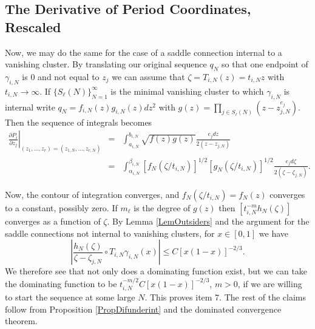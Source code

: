 \documentclass[12pt]{article}
\begin{document}
\subsection{The Derivative of Period Coordinates, Rescaled}

\noindent Now, we may do the same for the case of a saddle connection internal to a vanishing cluster. By translating our original sequence $q_N$ so that one endpoint of $\gamma_{i,N}$ is $0$ and not equal to $z_j$ we can assume that $\zeta = T_{i,N}(z) = t_{i,N}z$ with $t_{i,N} \to \infty$. If $\{S_\ell(N)\}_{N = 1}^\infty$ is the minimal vanishing cluster to which $\gamma_{i,N}$ is internal write $q_N = f_{i,N}(z)g_{i,N}(z)dz^2$ with $g(z) = \prod\limits_{j \in S_\ell(N)}(z - z_{j,N}^{e_j}).$ Then the sequence of integrals becomes $$\begin{array}{rcl} \left. \frac{\partial P_i}{\partial z_j}\right|_{(z_1,...,z_r) = (z_{1,N},...,z_{r,N})} & = & \int_{a_{i,N}}^{b_{i,N}} \sqrt{f(z)g(z)} \frac{e_j dz}{2(z - z_{j,N})}\\
{} & = & \int_{\alpha_{i,N}}^{\beta_{i,N}} [f_N(\zeta/t_{i,N})]^{1/2} [g_N(\zeta/t_{i,N})]^{1/2} \frac{e_j d\zeta}{2(\zeta - \zeta_{j,N})}. \end{array}$$

\noindent Now, the contour of integration converges, and $f_N(\zeta/t_{i,N}) = f_N(z)$ converges to a constant, possibly zero. If $m_\ell$ is the degree of $g(z)$ then $[t_{i,N}^{-m}h_N(\zeta)]$ converges as a function of $\zeta$. By Lemma \ref{LemOutsiders} and the argument for the saddle connections not internal to vanishing clusters, for $x \in [0,1]$ we have $$\left|\frac{h_N(\zeta)}{\zeta - \zeta_{j,N}} \circ T_{i,N} \gamma_{i,N}(x)\right| \leq C[x(1-x)]^{-2/3}.$$ We therefore see that not only does a dominating function exist, but we can take the dominating function to be $t_{i,N}^{-m/2}C[x(1-x)]^{-2/3}$, $m > 0$, if we are willing to start the sequence at some large $N$. This proves item 7. The rest of the claims follow from Proposition \ref{PropDifunderint} and the dominated convergence theorem.
\end{document}
